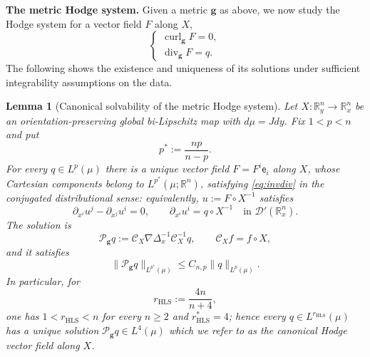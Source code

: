 \documentclass[11pt,reqno]{amsart}
\theoremstyle{plain}
\newtheorem{lemma}[theorem]{Lemma}
\theoremstyle{definition}
\theoremstyle{remark}
\numberwithin{equation}{section}
\DeclareMathOperator{\Div}{div}
\DeclareMathOperator{\curl}{curl}
\newcommand{\eframe}{\mathsf e}   %
\newcommand{\gmetric}{\mathbf g}
\newcommand{\Real}{\mathbb R}
\newcommand{\Rn}{\Real^n}
\begin{document}
\textbf{The metric Hodge system.} Given a metric $\gmetric$ as above, we now study the Hodge system for a vector field $F$ along $X$,
\begin{equation}\label{eq:invdiv}
    \begin{cases}
        \curl_{\gmetric}F=0,\\
     \Div_{\gmetric}F=q.
\end{cases}
\end{equation}
The following shows the existence and uniqueness of its solutions under sufficient integrability assumptions on the data.
\begin{lemma}[Canonical solvability of the metric Hodge system]
\label{lem:hodge-solvability}
Let $X:\Real_y^n\to\Real_x^n$ be an orientation-preserving global
bi-Lipschitz map with $d\mu=J dy$.  Fix $1<p<n$ and put
\[
 p^*:=\frac{np}{n-p}.
\]
For every $q\in L^p(\mu)$ there is a unique vector field $F=F^i\eframe_i$ along $X$, whose Cartesian components belong to
$L^{p^*}(\mu;\Rn)$, satisfying \eqref{eq:invdiv} in the conjugated
distributional sense: equivalently, $u:=F\circ X^{-1}$ satisfies
\[
 \partial_{x^i}u^j-\partial_{x^j}u^i=0,
 \qquad
 \partial_{x^i}u^i=q\circ X^{-1}
 \quad\text{in }\mathcal D'(\Real_x^n).
\]
The solution is
\begin{equation}\label{eq:pressure-gradient}
 \mathcal P_{\gmetric}q
 :=\mathcal C_X\nabla\Delta_x^{-1}\mathcal C_X^{-1}q, \qquad \mathcal{C}_Xf=f\circ X,
\end{equation}
and it satisfies
\begin{equation}\label{eq:canonical-hls}
 \|\mathcal P_{\gmetric}q\|_{L^{p^*}(\mu)}
 \le C_{n,p}\|q\|_{L^p(\mu)}.
\end{equation}
In particular, for
\begin{equation}\label{eq:rHLS}
    r_{\mathrm{HLS}}:=\frac{4n}{n+4},
\end{equation}
one has $1<r_{\mathrm{HLS}}<n$ for every $n\ge2$ and $r_{\mathrm{HLS}}^*=4$; hence
every $q\in L^{r_{\mathrm{HLS}}}(\mu)$ has a unique solution
$\mathcal P_{\gmetric}q\in L^4(\mu)$ which we refer to as the canonical Hodge vector field along $X$.
\end{lemma}
\end{document}
